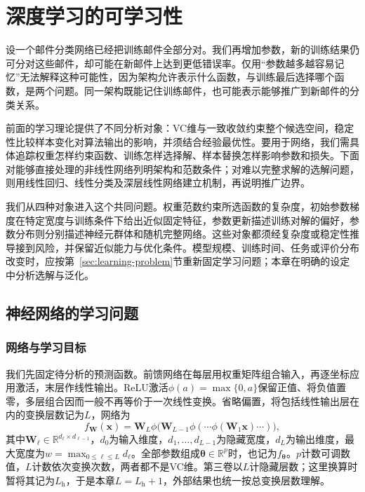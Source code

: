 \chapter{深度学习的可学习性}
\label{chap:deep-learning-theory}

设一个邮件分类网络已经把训练邮件全部分对。我们再增加参数，新的训练结果仍可分对这些邮件，却可能在新邮件上达到更低错误率。仅用“参数越多越容易记忆”无法解释这种可能性，因为架构允许表示什么函数，与训练最后选择哪个函数，是两个问题。同一架构既能记住训练邮件，也可能表示能够推广到新邮件的分类关系。

前面的学习理论提供了不同分析对象：VC维与一致收敛约束整个候选空间，稳定性比较样本变化对算法输出的影响，并须结合经验最优性。要用于网络，我们需具体追踪权重怎样约束函数、训练怎样选择解、样本替换怎样影响参数和损失。下面对能够直接处理的非线性网络列明架构和范数条件；对难以完整求解的选解问题，则用线性回归、线性分类及深层线性网络建立机制，再说明推广边界。

我们从四种对象进入这个共同问题。权重范数约束所选函数的复杂度，初始参数梯度在特定宽度与训练条件下给出近似固定特征，参数更新描述训练对解的偏好，参数分布则分别描述神经元群体和随机完整网络。这些对象都须经复杂度或稳定性推导接到风险，并保留近似能力与优化条件。模型规模、训练时间、任务或评价分布改变时，应按第~\ref{sec:learning-problem}节重新固定学习问题；本章在明确的设定中分析选解与泛化。

\section{神经网络的学习问题}
\label{sec:network-learning-problem}

\subsection{网络与学习目标}

我们先固定待分析的预测函数。前馈网络在每层用权重矩阵组合输入，再逐坐标应用激活，末层作线性输出。ReLU激活$\phi(a)=\max\{0,a\}$保留正值、将负值置零，多层组合因而一般不再等价于一次线性变换。省略偏置，将包括线性输出层在内的变换层数记为$L$，网络为
\begin{equation}
 f_{\bm W}(\bm x)=\bm W_L\phi\bigl(\bm W_{L-1}\phi(\cdots\phi(\bm W_1\bm x)\cdots)\bigr),
 \label{eq:feedforward-network}
\end{equation}
其中$\bm W_\ell\in\mathbb R^{d_\ell\times d_{\ell-1}}$，$d_0$为输入维度，$d_1,\ldots,d_{L-1}$为隐藏宽度，$d_L$为输出维度，最大宽度为$w=\max_{0\leq\ell\leq L}d_\ell$。全部参数组成$\bm\theta\in\mathbb R^p$时，也记为$f_{\bm\theta}$。$p$计数可调数值，$L$计数依次变换次数，两者都不是VC维。第三卷以$L$计隐藏层数；这里换算时暂将其记为$L_{\mathrm h}$，于是本章$L=L_{\mathrm h}+1$，外部结果也统一按总变换层数理解。


